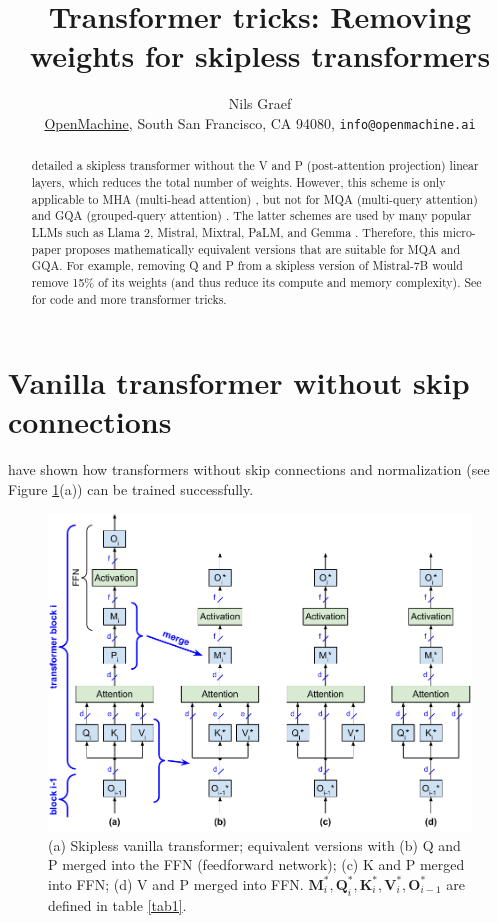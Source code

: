 \documentclass{article}
\title{Transformer tricks: Removing weights for skipless transformers}
\author{Nils Graef \\ \href{https://openmachine.ai}{OpenMachine},
  South San Francisco, CA 94080, \texttt{info@openmachine.ai}}
\newcommand{\mat}[1]{\mathbf{#1}}  %
\def\Q{\mat{Q}_i}
\def\K{\mat{K}_i}
\def\V{\mat{V}_i}
\def\O{\mat{O}_{i-1}}
\def\M{\mat{M}_i}
\begin{document}
 \maketitle

\begin{abstract}
\citet{simplified} detailed a skipless transformer without the V and P (post-attention projection) linear layers, which reduces the total number of weights. However, this scheme is only applicable to MHA (multi-head attention) \cite{vanilla}, but not for MQA (multi-query attention) \cite{MQA} and GQA (grouped-query attention) \cite{GQA}. The latter schemes are used by many popular LLMs such as Llama 2, Mistral, Mixtral, PaLM, and Gemma \cite{Llama2, mistral, mixtral, PaLM, gemma}. Therefore, this micro-paper \cite{micro-paper} proposes mathematically equivalent versions that are suitable for MQA and GQA. For example, removing Q and P from a skipless version of Mistral-7B would remove 15\% of its weights (and thus reduce its compute and memory complexity). See \cite{tricks, precompute} for code and more transformer tricks.
\end{abstract}

\section{Vanilla transformer without skip connections}

\citet{skipless} have shown how transformers without skip connections and normalization (see Figure \ref{fig1}(a)) can be trained successfully.

\begin{figure}[h!] \centering %
  \includegraphics[scale=0.90]{figs/remove_fig1.pdf}
  \caption{(a) Skipless vanilla transformer; equivalent versions with (b) Q and P merged into the FFN (feedforward network); (c) K and P merged into FFN; (d) V and P merged into FFN. $\M^*, \Q^*, \K^*, \V^*, \O^*$ are defined in table \ref{tab1}.}
\label{fig1} \end{figure}
\end{document}
